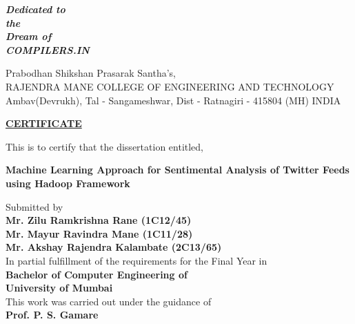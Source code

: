 \documentclass[a4paper,12pt]{report}
\def\baselinestretch{1.5}
\begin{document}
\newpage
\thisfancypage{%
\setlength{\fboxsep}{12pt}\doublebox}{}
\begin{center}
\vspace*{\fill}
\Huge{\bf{\textit{Dedicated to\\the\\Dream of\\COMPILERS.IN\\}}}

\vspace*{\fill}
\end{center}
\newpage
\thisfancypage{%
\setlength{\fboxsep}{12pt}\doublebox}{}
\begin{center}
\def \baselinestretch{1}
Prabodhan Shikshan Prasarak Santha's,\\
\large {RAJENDRA MANE COLLEGE OF ENGINEERING AND TECHNOLOGY
Ambav(Devrukh), Tal - Sangameshwar, Dist - Ratnagiri - 415804 (MH) INDIA}
\end{center}
\vspace*{5mm}
\begin{center}
\def \baselinestretch{1}
\huge \bf \underline{CERTIFICATE}
\end{center}
\vspace{3mm}
\begin{center}
This is to certify that the dissertation entitled,
\end{center}
\begin{center}
\def\baselinestretch{1}
\huge \bf{Machine Learning Approach for
Sentimental Analysis of Twitter Feeds
using Hadoop Framework}
\end{center}
\vspace{3mm}
\begin{center}	
	\def\baselinestretch{1.5}
{\large
Submitted by\\
{\bf
	\def\baselinestretch{1.5}{
Mr. Zilu Ramkrishna Rane  (1C12/45)\\
Mr. Mayur Ravindra Mane (1C11/28)\\
Mr. Akshay Rajendra Kalambate (2C13/65)\\

}}
In partial fulfillment of the requirements for the Final Year in\\
\vspace{3mm}
{\large
\textbf{
Bachelor of Computer Engineering of\\
University of Mumbai}}\\
\vspace{3mm}
This work was carried out under the guidance of\\
\large {\bf Prof. P. S. Gamare}}
\end{center}
\end{document}
